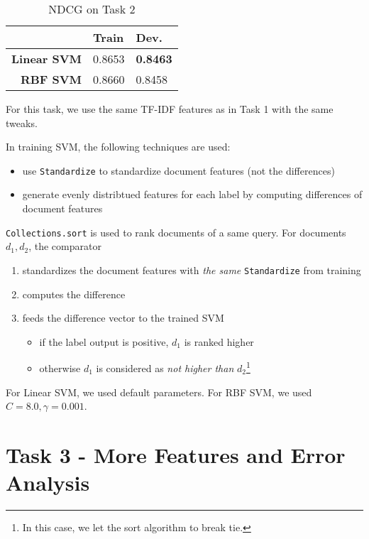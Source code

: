 \documentclass{article}
\begin{document}
\begin{table}[!htb]
    \centering
    \begin{tabular}{| r | l | l |}
        \hline
        & \textbf{Train} & \textbf {Dev.} \\
        \hline
        \textbf{Linear SVM} & 0.8653 & \textbf{0.8463} \\
        \hline
        \textbf{RBF SVM} & 0.8660 & 0.8458 \\
        \hline
    \end{tabular}
    \caption{NDCG on Task 2}
\end{table}

For this task, we use the same TF-IDF features as in Task 1 with the same tweaks.

In training SVM, the following techniques are used:

\begin{itemize}
    \item use \texttt{Standardize} to standardize document features (not the differences)
    \item generate evenly distribtued features for each label by computing differences of document features
\end{itemize}

\texttt{Collections.sort} is used to rank documents of a same query.
For documents $d_1,d_2$, the comparator

\begin{enumerate}
    \item standardizes the document features with \emph{the same} \texttt{Standardize} from training
    \item computes the difference
    \item feeds the difference vector to the trained SVM
        \begin{itemize}
            \item if the label output is positive, $d_1$ is ranked higher
            \item otherwise $d_1$ is considered as \emph{not higher than} $d_2$\footnote{In this case, we let the sort algorithm to break tie.}
        \end{itemize}
\end{enumerate}

For Linear SVM, we used default parameters. For RBF SVM, we used $C=8.0,\gamma=0.001$.

\section{Task 3 - More Features and Error Analysis}
\end{document}
